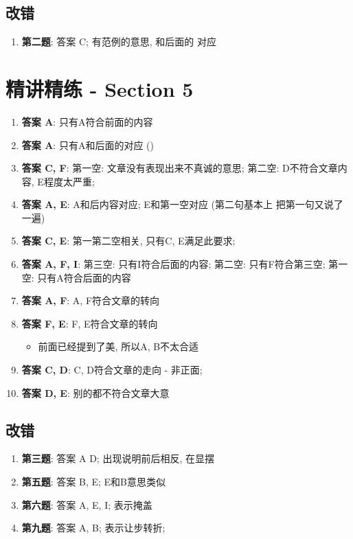   \subsection{改错}

    \begin{enumerate}
      \item \textbf{第二题}: 答案 C; 有范例的意思, 和后面的
      对应
    \end{enumerate}

\section{精讲精练 - Section 5}

  \begin{enumerate}
    \item \textbf{答案 A}: 只有A符合前面的内容
    \item \textbf{答案 A}: 只有A和后面的对应
    ()
    \item \textbf{答案 C, F}: 第一空: 文章没有表现出来不真诚的意思;
    第二空: D不符合文章内容, E程度太严重;
    \item \textbf{答案 A, E}: A和后内容对应; E和第一空对应 (第二句基本上
    把第一句又说了一遍)
    \item \textbf{答案 C, E}: 第一第二空相关, 只有C, E满足此要求;
    \item \textbf{答案 A, F, I}: 第三空: 只有I符合后面的内容; 第二空: 只有F符合第三空;
    第一空: 只有A符合后面的内容
    \item \textbf{答案 A, F}: A, F符合文章的转向
    \item \textbf{答案 F, E}: F, E符合文章的转向
    \begin{itemize}
      \item 前面已经提到了美, 所以A, B不太合适
    \end{itemize}

    \item \textbf{答案 C, D}: C, D符合文章的走向 - 非正面;
    \item \textbf{答案 D, E}: 别的都不符合文章大意
  \end{enumerate}

  \subsection{改错}

    \begin{enumerate}
      \item \textbf{第三题}: 答案 A D; 出现说明前后相反, 
      在显摆
      \item \textbf{第五题}: 答案 B, E; E和B意思类似
      \item \textbf{第六题}: 答案 A, E, I; 表示掩盖
      \item \textbf{第九题}: 答案 A, B; 表示让步转折;
    \end{enumerate}
